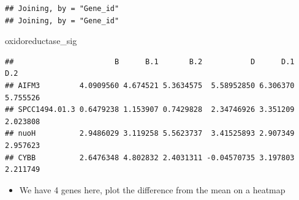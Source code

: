 \documentclass[
]{article}
\newenvironment{Shaded}{\begin{snugshade}}{\end{snugshade}}
\newcommand{\DataTypeTok}[1]{\textcolor[rgb]{0.13,0.29,0.53}{#1}}
\newcommand{\DecValTok}[1]{\textcolor[rgb]{0.00,0.00,0.81}{#1}}
\newcommand{\KeywordTok}[1]{\textcolor[rgb]{0.13,0.29,0.53}{\textbf{#1}}}
\newcommand{\NormalTok}[1]{#1}
\newcommand{\OperatorTok}[1]{\textcolor[rgb]{0.81,0.36,0.00}{\textbf{#1}}}
\newcommand{\OtherTok}[1]{\textcolor[rgb]{0.56,0.35,0.01}{#1}}
\newcommand{\StringTok}[1]{\textcolor[rgb]{0.31,0.60,0.02}{#1}}
\providecommand{\tightlist}{%
  \setlength{\itemsep}{0pt}\setlength{\parskip}{0pt}}
\begin{document}
\begin{Shaded}
\end{Shaded}

\begin{verbatim}
## Joining, by = "Gene_id"
## Joining, by = "Gene_id"
\end{verbatim}

\begin{Shaded}
\begin{Highlighting}[]
\NormalTok{oxidoreductase_sig}
\end{Highlighting}
\end{Shaded}

\begin{verbatim}
##                       B      B.1       B.2           D      D.1      D.2
## AIFM3         4.0909560 4.674521 5.3634575  5.58952850 6.306370 5.755526
## SPCC1494.01.3 0.6479238 1.153907 0.7429828  2.34746926 3.351209 2.023808
## nuoH          2.9486029 3.119258 5.5623737  3.41525893 2.907349 2.957623
## CYBB          2.6476348 4.802832 2.4031311 -0.04570735 3.197803 2.211749
\end{verbatim}

\begin{itemize}
\tightlist
\item
  We have 4 genes here, plot the difference from the mean on a heatmap
\end{itemize}
\end{document}
